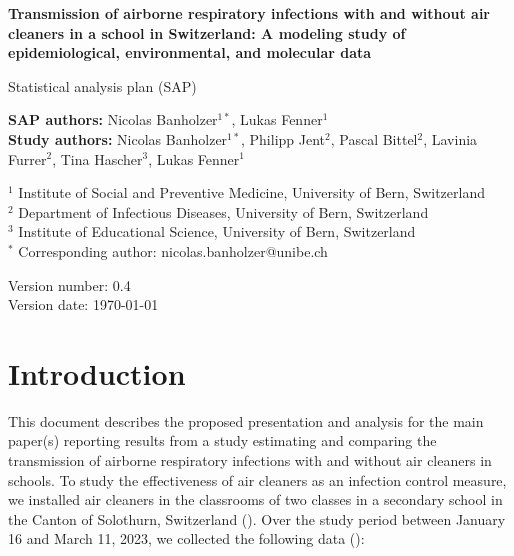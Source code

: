 \documentclass{article}
\begin{document}
\begin{titlepage}
        \vspace*{1cm}
            
        \LARGE
        \textbf{Transmission of airborne respiratory infections with and without air cleaners in a school in Switzerland: A modeling study of epidemiological, environmental, and molecular data}
            
        \vspace{0.5cm}
        \Large
        Statistical analysis plan (SAP)
            
        \vspace{1.5cm}
            
        \textbf{SAP authors:} Nicolas Banholzer$^{1*}$, Lukas Fenner$^1$ \\
        \textbf{Study authors:} Nicolas Banholzer$^{1*}$, Philipp Jent$^{2}$, Pascal Bittel$^{2}$, Lavinia Furrer$^{2}$, Tina Hascher$^{3}$, Lukas Fenner$^1$

        \vspace{1cm}

        $^1$ Institute of Social and Preventive Medicine, University of Bern, Switzerland \\
        $^2$ Department of Infectious Diseases, University of Bern, Switzerland \\
        $^3$ Institute of Educational Science, University of Bern, Switzerland \\
        $^*$ Corresponding author: nicolas.banholzer@unibe.ch
            
        \vfill
            
        \Large
        Version number: 0.4 \\
        Version date: \today 

        \vspace*{1cm}
\end{titlepage}

\tableofcontents

\clearpage

\section{Introduction}

This document describes the proposed presentation and analysis for the main paper(s) reporting results from a study estimating and comparing the transmission of airborne respiratory infections with and without air cleaners in schools. To study the effectiveness of air cleaners as an infection control measure, we installed air cleaners in the classrooms of two classes in a secondary school in the Canton of Solothurn, Switzerland (). Over the study period between January 16 and March 11, 2023, we collected the following data ():
\end{document}
